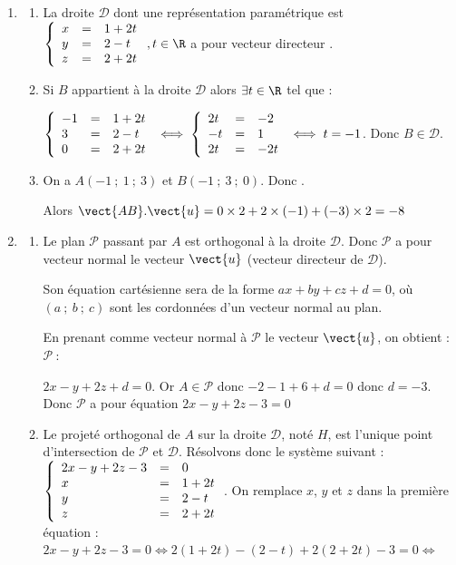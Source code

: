 
\medskip

\begin{enumerate}
	\item 
	\begin{enumerate}
	\item La droite $\mathcal{D}$ dont une représentation paramétrique est $\left\{\begin{array}{l c l}
		x&=&1+2t\\y &=& 2 - t\\z&=& 2+2t
	\end{array}\right.  , t \in \R$ a pour vecteur directeur .
	\item Si $B$ appartient à la droite $\mathcal{D}$ alors $\exists t \in \R$ tel que :
	
	 $\left\{\begin{array}{l c l} -1&=&1+2t\\3 &=& 2 - t\\0&=& 2+2t
	\end{array}\right.\iff \left\{\begin{array}{l c l}
	2t&=&-2\\-t&=&1\\2t&=&-2t\end{array}\right. \iff t=-1 $. Donc $B \in  \mathcal{D}$.
\item On a $A(-1~;~1~;~3)$ et $B(-1~;~3~;~0)$. Donc .

Alors $\vect{AB}.\vect{u}=0\times 2+2\times (-1)+(-3)\times 2=-8$
\end{enumerate}
\item 
	\begin{enumerate}
		\item Le plan $\mathcal{P}$ passant par $A$ est orthogonal à la droite $\mathcal{D}$. Donc $\mathcal{P}$ a pour vecteur normal le vecteur $\vect{u}$ (vecteur directeur de $\mathcal{D}$).
	
Son équation cartésienne sera de la forme $ax+by+cz+d=0$, où $(a~;~b~;~c)$ sont les cordonnées d'un vecteur normal au plan.
	
En prenant comme vecteur normal à $\mathcal{P}$ le vecteur $\vect{u}$, on obtient : $\mathcal{P}~:$

$2x-y+2z+d=0$. Or $A\in \mathcal{P}$ donc $-2-1+6+d=0$ donc $d=-3$. Donc $\mathcal{P}$ a pour équation $2x-y+2z-3=0$
		\item Le projeté orthogonal de $A$ sur la droite $\mathcal{D}$, noté $H$, est l'unique point d'intersection de $\mathcal{P}$ et $\mathcal{D}$. Résolvons donc le système suivant : \\
	$\left\{\begin{array}{l c l} 2x-y + 2z-3&=&0\\x&=&1+2t\\y &=& 2 - t\\z&=& 2+2t \end{array}\right.$. On remplace $x$, $y$ et $z$ dans la première équation :\\
	$2x-y+2z-3=0\iff 2(1 + 2t)-(2 - t)+2(2 + 2t) - 3 = 0 \iff $
	

\end{enumerate}
\end{enumerate}
